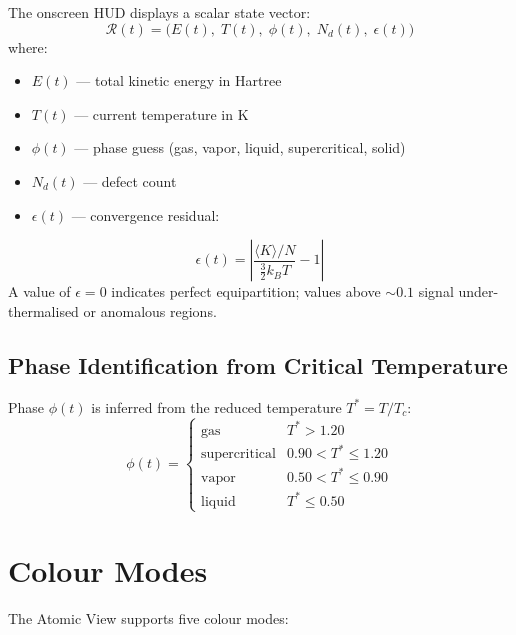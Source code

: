 ﻿\documentclass[11pt]{article}
\begin{document}
The onscreen HUD displays a scalar state vector:
\begin{equation}
  \mathcal{R}(t) = \bigl(E(t),\;T(t),\;\phi(t),\;N_d(t),\;\epsilon(t)\bigr)
\end{equation}
where:
\begin{itemize}[noitemsep]
  \item $E(t)$ --- total kinetic energy in Hartree
  \item $T(t)$ --- current temperature in K
  \item $\phi(t)$ --- phase guess (gas, vapor, liquid, supercritical, solid)
  \item $N_d(t)$ --- defect count
  \item $\epsilon(t)$ --- convergence residual:
\end{itemize}
\begin{equation}
  \epsilon(t) = \left|\frac{\langle K \rangle / N}{\frac{3}{2}k_B T} - 1\right|
\end{equation}
A value of $\epsilon = 0$ indicates perfect equipartition; values above $\sim0.1$
signal under-thermalised or anomalous regions.

\subsection{Phase Identification from Critical Temperature}

Phase $\phi(t)$ is inferred from the reduced temperature $T^* = T/T_c$:
\begin{equation}
  \phi(t) = \begin{cases}
    \text{gas}          & T^* > 1.20 \\
    \text{supercritical}& 0.90 < T^* \leq 1.20 \\
    \text{vapor}        & 0.50 < T^* \leq 0.90 \\
    \text{liquid}       & T^* \leq 0.50
  \end{cases}
\end{equation}

\section{Colour Modes}
\label{sec:colour}

The Atomic View supports five colour modes:
\end{document}
